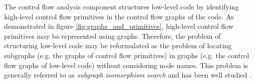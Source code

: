
The control flow analysis component structures low-level code by identifying high-level control flow primitives in the control flow graphs of the code. As demonstrated in figure \ref{fig:graphs_and_primitives}, high-level control flow primitives may be represented using graphs. Therefore, the problem of structuring low-level code may be reformulated as the problem of locating subgraphs (e.g. the graphs of control flow primitives) in graphs (e.g. the control flow graphs of low-level code) without considering node names. This problem is generally referred to as \textit{subgraph isomorphism search} and has been well studied \cite{subgraph_isomorphism_algorithms}.

\begin{figure}[htbp]
	\centering
	\begin{subfigure}[ht]{0.10\textwidth}
		
	\end{subfigure}
	\enskip
	\begin{subfigure}[ht]{0.10\textwidth}

\end{subfigure}
\end{figure}

